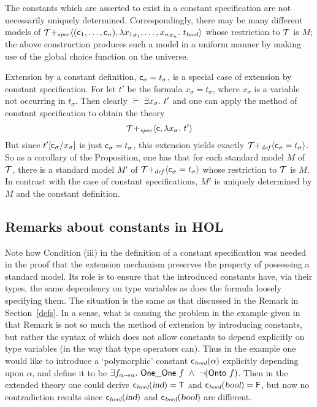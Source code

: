 \medskip

The constants which are asserted to exist in a constant specification
are not necessarily uniquely determined.  Correspondingly, there may
be many different models of ${\cal T}{+_{\it
spec}}\langle({\sf c}_1,\ldots,{\sf c}_n),
\lambda {x_1}_{\sigma_1},\ldots,{x_n}_{\sigma_n}.\ t_{\textsl{bool}}
\rangle$ whose restriction to $\cal T$ is $M$; the above construction
produces such a model in a uniform manner by making use of the global
choice function on the universe.

Extension by a constant definition, ${\sf c}_\sigma=t_\sigma$, is a
special case of extension by constant specification. For let $t'$ be
the formula $x_\sigma=t_\sigma$, where $x_\sigma$ is a variable not
occurring in $t_\sigma$. Then clearly $\ \vdash\ 
\exists x_\sigma.\ t'$ and one can apply the method of constant
specification to obtain the theory
\[
{\cal T}{+_{\it spec}}\langle {\sf c},\lambda x_\sigma.\ t'\rangle
\]
But since $t'[{\sf c}_\sigma/x_\sigma]$ is just
${\sf c}_\sigma=t_\sigma$,
this extension yields exactly ${\cal T}{+_{\it def}}\langle
{\sf c}_{\sigma}=t_{\sigma}\rangle$.
So as a corollary of the Proposition, one has that for each standard
model $M$ of $\cal T$, there is a standard model $M'$ of ${\cal
T}{+_{\it def}}\langle{\sf c}_{\sigma}=t_{\sigma}\rangle$ whose
restriction to $\cal T$ is $M$. In contrast with the case of constant
specifications, $M'$ is uniquely determined by $M$ and the constant
definition.

\subsection{Remarks about constants in HOL}
\label{constants}

Note how Condition (iii) in the definition of a constant specification
was needed in the proof that the extension mechanism preserves the
property of possessing a standard model. Its role is to ensure that
the introduced constants have, via their types, the same dependency on
type variables as does the formula loosely specifying them. The
situation is the same as that discussed in the Remark in
Section~\ref{defs}. In a sense, what is causing the problem in the
example given in that Remark is not so much the method of extension by
introducing constants, but rather the syntax of \HOL{} which does not
allow constants to depend explicitly on type variables (in the way
that type operators can). Thus in the example one would like to
introduce a `polymorphic' constant ${\sf c}_{\textsl{bool}}(\alpha)$
explicitly depending upon $\alpha$, and define it to be
$\exists f_{\alpha{\to}\alpha}.\  {\sf One\_One} \ f \ \wedge\ 
\neg({\sf Onto} \ f)$.  Then in the extended theory one could derive
${\sf c}_{\textsl{bool}}(\textsl{ind})={\sf T}$ and
${\sf c}_{\textsl{bool}}(\textsl{bool})={\sf F}$, but now no contradiction results since
${\sf c}_{\textsl{bool}}(\textsl{ind})$ and ${\sf c}_{\textsl{bool}}(\textsl{bool})$
are different.

